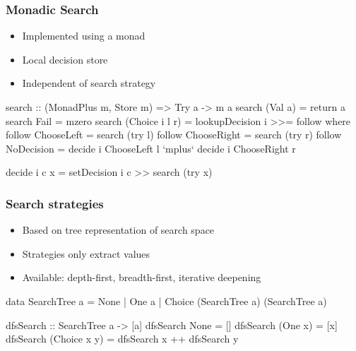\documentclass[
,hyperref={pdfpagelabels=false}
]{beamer}
\begin{document}
\begin{frame}[fragile]%
\frametitle{Monadic Search}

\begin{itemize}
  \item Implemented using a  monad
  \item Local decision store
  \item Independent of search strategy
\end{itemize}

\begin{haskell}
search :: (MonadPlus m, Store m) => Try a -> m a
search (Val a)        = return a
search Fail           = mzero
search (Choice i l r) = lookupDecision i >>= follow
  where
  follow ChooseLeft  = search (try l)
  follow ChooseRight = search (try r)
  follow NoDecision  = decide i ChooseLeft  l
               `mplus` decide i ChooseRight r

  decide i c x = setDecision i c >> search (try x)
\end{haskell}
\end{frame}

\begin{frame}[fragile]%
\frametitle{Search strategies}
\begin{itemize}
  \item Based on tree representation of search space
  \item Strategies only extract values
  \item Available: depth-first, breadth-first, iterative deepening
\end{itemize}

\begin{haskell}[SearchTree]
data SearchTree a = None
                  | One a
                  | Choice (SearchTree a) (SearchTree a)
\end{haskell}

\begin{haskell}
dfsSearch :: SearchTree a -> [a]
dfsSearch None         = []
dfsSearch (One      x) = [x]
dfsSearch (Choice x y) = dfsSearch x ++ dfsSearch y
\end{haskell}
\end{frame}
\end{document}
